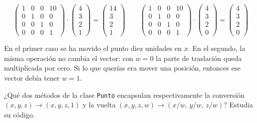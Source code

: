 \documentclass[
  spanish,
  11pt,
  a4paper,
  DIV=11,
  numbers=noendperiod]{scrartcl}
\begin{document}
\[
\begin{pmatrix}
1 & 0 & 0 & 10\\
0 & 1 & 0 & 0\\
0 & 0 & 1 & 0\\
0 & 0 & 0 & 1
\end{pmatrix}
\cdot
\begin{pmatrix}4\\3\\2\\1\end{pmatrix}
=
\begin{pmatrix}14\\3\\2\\1\end{pmatrix}
\qquad
\begin{pmatrix}
1 & 0 & 0 & 10\\
0 & 1 & 0 & 0\\
0 & 0 & 1 & 0\\
0 & 0 & 0 & 1
\end{pmatrix}
\cdot
\begin{pmatrix}4\\3\\2\\0\end{pmatrix}
=
\begin{pmatrix}4\\3\\2\\0\end{pmatrix}
\]

En el primer caso se ha movido el punto diez unidades en \(x\). En el segundo, la misma operación no cambia el vector: con \(w = 0\) la parte de traslación queda multiplicada por cero. Si lo que querías era mover una posición, entonces ese vector debía tener \(w = 1\).

\begin{tcolorbox}[enhanced jigsaw, colframe=quarto-callout-note-color-frame, arc=.35mm, bottomrule=.15mm, left=2mm, breakable, opacityback=0, coltitle=black, bottomtitle=1mm, toptitle=1mm, titlerule=0mm, toprule=.15mm, rightrule=.15mm, title={Busca en el código}, colbacktitle=quarto-callout-note-color!10!white, opacitybacktitle=0.6, colback=white, leftrule=.75mm]

¿Qué dos métodos de la clase \texttt{Punto} encapsulan respectivamente la conversión \((x,y,z) \to (x,y,z,1)\) y la vuelta \((x,y,z,w) \to (x/w,\,y/w,\,z/w)\)? Estudia su código.

\end{tcolorbox}
\end{document}
